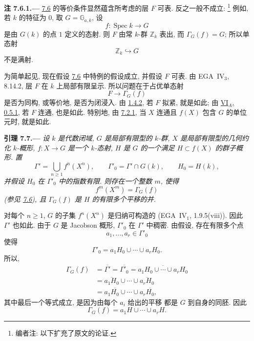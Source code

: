 
\medskip
{}\label{rem:sga3-VIB-7.6.1}%
\noindent\textbf{注 7.6.1.---}
\hyperref[prop:sga3-VIB-7.6]{7.6} 的等价条件显然蕴含所考虑的层
\(F\) 可表. 反之一般不成立:%
\footnote{\label{note:sga3-VIB-78}编者注: 以下扩充了原文的论证.}
例如, 若 \(k\) 的特征为 \(0\), 取 \(G=\mathbb G_{a,k}\),
设
\[
  f:\operatorname{Spec}k\longrightarrow G
\]
是由 \(G(k)\) 的点 \(1\) 定义的态射.
则 \(F\) 由常 \(k\)-群 \(\mathbb Z_k\) 表出,
而 \(\Gamma_G(f)=G\); 所以单态射
\[
  \mathbb Z_k\hookrightarrow G
\]
不是满射.

为简单起见, 现在假设 \hyperref[prop:sga3-VIB-7.6]{7.6}
中特例的假设成立, 并假设 \(F\) 可表.
由 EGA~IV\(_3\), 8.14.2, 层 \(F\) 在 \(k\) 上局部有限呈示.
所以问题在于占优单态射
\[
  F\longrightarrow\Gamma_G(f)
\]
是否为同构, 或等价地, 是否为闭浸入.
由 \hyperref[cor:sga3-VIB-1.4.2]{1.4.2}, 若 \(F\) 拟紧, 就是如此;
由 \hyperref[sga3:VIA:0.5.1]{VI\(_A\), 0.5.1}, 若 \(F\) 连通, 也是如此.
特别地, 由 \hyperref[cor:sga3-VIB-7.2.1]{7.2.1},
当 \(X\) 连通且 \(f(X)\) 包含 \(G\) 的单位元时, 就是如此.

\medskip
{}\label{lem:sga3-VIB-7.7}%
\noindent\textbf{引理 7.7.---}
\emph{设 \(k\) 是代数闭域, \(G\) 是局部有限型的 \(k\)-群,
\(X\) 是局部有限型的几何约化 \(k\)-概形,
\(f:X\to G\) 是一个 \(k\)-态射,
\(H\) 是 \(G\) 的一个满足 \(H\subset f(X)\) 的群子概形. 置}
\label{form:sga3-VIB-7.7-Gamma-prime}%
\[
  \Gamma'=\bigcup_{n\geq1}f^n(X^n),
  \qquad
  \Gamma'_0=\Gamma'\cap G(k),
  \qquad
  H_0=H(k),
\]
\emph{并假设 \(H_0\) 在 \(\Gamma'_0\) 中的指数有限.
则存在一个整数 \(m\), 使得}
\[
  f^m(X^m)=\Gamma_G(f)
\]
\emph{(参见 \hyperref[prop:sga3-VIB-7.6]{7.6}),
且 \(\Gamma_G(f)\) 是 \(H\) 的有限多个平移的并.}

对每个 \(n\geq1\), \(G\) 的子集 \(f^n(X^n)\)
是归纳可构造的 (EGA~IV\(_1\), 1.9.5\textup{(viii)}).
因此 \(\Gamma'\) 也如此.
由于 \(G\) 是 Jacobson 概形, \(\Gamma'_0\) 在 \(\Gamma'\) 中稠密.
由假设, 存在有限多个点
\[
  a_1,\ldots,a_r\in\Gamma'_0
\]
使得
\[
  \Gamma'_0=a_1H_0\cup\cdots\cup a_rH_0.
\]
所以,
\label{form:sga3-VIB-7.7-closure-chain}%
\[
\begin{aligned}
  \Gamma_G(f)
    &=\overline{\Gamma'}
     =\overline{\Gamma'_0}
     =\overline{a_1H_0\cup\cdots\cup a_rH_0}\\
    &=\overline{a_1H_0}\cup\cdots\cup\overline{a_rH_0}\\
    &=a_1\overline{H_0}\cup\cdots\cup
      a_r\overline{H_0},
\end{aligned}
\]
其中最后一个等式成立, 是因为由每个 \(a_i\) 给出的平移
都是 \(G\) 到自身的同胚. 因此
\[
  \Gamma_G(f)=a_1H\cup\cdots\cup a_rH.
\]

